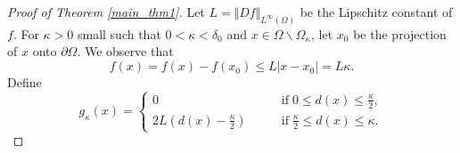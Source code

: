 \documentclass[12pt,reqno]{amsart}
\numberwithin{figure}{section}
\theoremstyle{plain}
\theoremstyle{remark}
\numberwithin{equation}{section}
\begin{document}
\begin{proof}[Proof of Theorem \ref{main_thm1}] Let $L = \Vert D f\Vert_{L^\infty(\Omega)}$ be the Lipschitz constant of $f$. For $\kappa>0$ small such that $0<\kappa<\delta_0$ and $x\in \Omega\backslash \Omega_\kappa$, let $x_0$ be the projection of $x$ onto $\partial\Omega$. We observe that
\begin{equation}\label{e:bound_aa}
    f(x) = f(x) - f(x_0) \leq L|x-x_0| = L\kappa.
\end{equation}
Define
\begin{equation*}
    g_\kappa(x) = 
    \begin{cases}
        0           &\qquad\text{if}\;0\leq d(x) \leq \frac{\kappa}{2},\\
        2L\left(d(x)-\frac{\kappa}{2}\right)       &\qquad\text{if}\;\frac{\kappa}{2}\leq d(x) \leq \kappa.
    \end{cases}
\end{equation*}


\end{proof}
\end{document}
